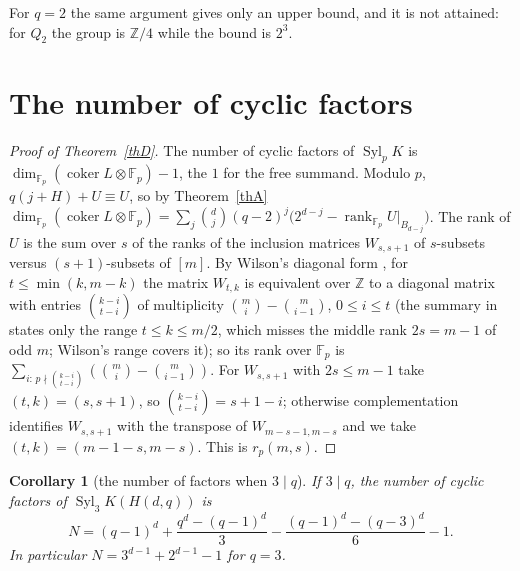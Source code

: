 \documentclass[10pt]{article}
\theoremstyle{ds}
\newtheorem{corollary}[lemma]{Corollary}
\theoremstyle{dsrem}
\newcommand{\Z}{\mathbb{Z}}
\newcommand{\F}{\mathbb{F}}
\newcommand{\Syl}{\operatorname{Syl}}
\newcommand{\coker}{\operatorname{coker}}
\newcommand{\rank}{\operatorname{rank}}
\begin{document}
For $q=2$ the same argument gives only an upper bound, and it is not attained: for $Q_2$ the group is $\Z/4$ while the bound is $2^3$.

\section{The number of cyclic factors}

\begin{proof}[Proof of Theorem~\ref{thD}]
The number of cyclic factors of $\Syl_p K$ is $\dim_{\F_p}(\coker L\otimes\F_p)-1$, the $1$ for the free summand. Modulo $p$, $q(j+H)+U\equiv U$, so by Theorem~\ref{thA} $\dim_{\F_p}(\coker L\otimes\F_p)=\sum_j\binom dj(q-2)^j\big(2^{d-j}-\rank_{\F_p}U|_{B_{d-j}}\big)$. The rank of $U$ is the sum over $s$ of the ranks of the inclusion matrices $W_{s,s+1}$ of $s$-subsets versus $(s+1)$-subsets of $[m]$. By Wilson's diagonal form \cite[Theorem~2]{Wil}, for $t\le\min(k,m-k)$ the matrix $W_{t,k}$ is equivalent over $\Z$ to a diagonal matrix with entries $\binom{k-i}{t-i}$ of multiplicity $\binom mi-\binom m{i-1}$, $0\le i\le t$ (the summary in \cite[(2)]{CSX} states only the range $t\le k\le m/2$, which misses the middle rank $2s=m-1$ of odd $m$; Wilson's range covers it); so its rank over $\F_p$ is $\sum_{i:\,p\nmid\binom{k-i}{t-i}}(\binom mi-\binom m{i-1})$. For $W_{s,s+1}$ with $2s\le m-1$ take $(t,k)=(s,s+1)$, so $\binom{k-i}{t-i}=s+1-i$; otherwise complementation identifies $W_{s,s+1}$ with the transpose of $W_{m-s-1,m-s}$ and we take $(t,k)=(m-1-s,m-s)$. This is $r_p(m,s)$.
\end{proof}


\begin{corollary}[the number of factors when $3\mid q$]\label{corN}
If $3\mid q$, the number of cyclic factors of $\Syl_3K(H(d,q))$ is
\[
N=(q-1)^d+\frac{q^d-(q-1)^d}{3}-\frac{(q-1)^d-(q-3)^d}{6}-1 .
\]
In particular $N=3^{d-1}+2^{d-1}-1$ for $q=3$.
\end{corollary}
\end{document}
